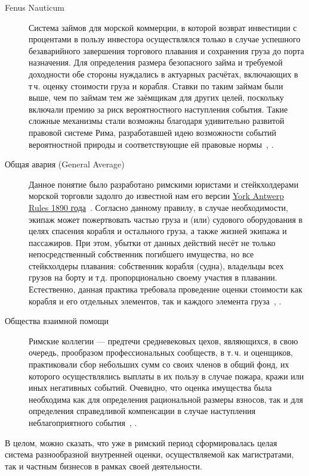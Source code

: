 \documentclass[12pt]{scrartcl}
\begin{document}
\begin{description}
	\item[Fenus Nauticum] Система займов для морской коммерции, в которой возврат инвестиции с процентами в пользу инвестора осуществлялся только в случае успешного безаварийного завершения торгового плавания и сохранения груза до порта назначения. Для определения размера безопасного займа и требуемой доходности обе стороны нуждались в актуарных расчётах, включающих в т\,ч. оценку стоимости груза и корабля. Ставки по таким займам были выше, чем по займам тем же заёмщикам для других целей, поскольку включали премию за риск вероятностного наступления события. Такие сложные механизмы стали возможны благодаря удивительно развитой правовой системе Рима, разработавшей идею возможности событий вероятностной природы и соответствующие ей правовые нормы~\cite{Wild1977}, \cite{Andreau1999}.
	\item[Общая авария (General Average)] Данное понятие было разработано римскими юристами и стейкхолдерами морской торговли задолго до известной нам его версии \href{https://www.investopedia.com/terms/y/york-antwerp-rules.asp}{York Antwerp Rules 1890 года}~\cite{Investopedia1890}. Согласно данному правилу, в случае необходимости, экипаж может пожертвовать частью груза и (или) судового оборудования в целях спасения корабля и остального груза, а также жизней экипажа и пассажиров. При этом, убытки от данных действий несёт не только непосредственный собственник погибшего имущества, но все стейкхолдеры плавания: собственник корабля (судна), владельцы всех грузов на борту и т\,д. пропорционально своему участия в плавании. Естественно, данная практика требовала проведение оценки стоимости как корабля и его отдельных элементов, так и каждого элемента груза~\cite{Casson2020}, \cite{Bagnall2004}.
	\item[Общества взаимной помощи] Римские коллегии --- предтечи средневековых цехов, являющихся, в свою очередь, прообразом профессиональных сообществ, в т.\,ч. и оценщиков, практиковали сбор небольших сумм со своих членов в общий фонд, их которого осуществлялись выплаты в их пользу в случае пожара, кражи или иных негативных событий. Очевидно, что оценка имущества была необходима как для определения рациональной размеры взносов, так и для определения справедливой компенсации в случае наступления неблагоприятного события~\cite{Smith1998}, \cite{Waltzing1895}.
\end{description}

В целом, можно сказать, что уже в римский период сформировалась целая система разнообразной внутренней оценки, осуществляемой как магистратами, так и частным бизнесов в рамках своей деятельности.
\end{document}
